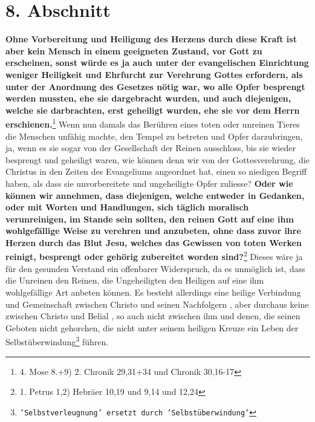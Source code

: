 \section{8. Abschnitt} \label{kap6_ab8}

\textbf{Ohne Vorbereitung und Heiligung des Herzens
durch diese Kraft ist aber kein
Mensch in einem geeigneten Zustand, vor Gott zu erscheinen, sonst würde es ja
auch unter der evangelischen Einrichtung weniger Heiligkeit und Ehrfurcht zur
Verehrung Gottes erfordern, als unter der Anordnung des Gesetzes nötig war, wo
alle Opfer besprengt werden mussten, ehe sie dargebracht wurden, und auch
diejenigen, welche sie darbrachten, erst geheiligt wurden, ehe sie vor dem
Herrn erschienen.}\footnote{4. Mose 8.+9) 2. Chronik 29,31+34 und Chronik
30,16-17}
Wenn nun damals das Berühren eines toten oder unreinen Tieres die Menschen
unfähig machte, den Tempel zu betreten und Opfer darzubringen, ja, wenn es sie
sogar von der Gesellschaft der Reinen ausschloss, bis sie wieder besprengt und
geheiligt waren, wie können denn wir von der Gottesverehrung, die Christus in
den Zeiten des Evangeliums angeordnet hat, einen so niedigen Begriff haben, als
dass sie unvorbereitete und ungeheiligte Opfer zuliesse?
\label{ref:06_08_moralisch_verunreinigt} \textbf{Oder wie können wir
annehmen, dass diejenigen, welche entweder in Gedanken, oder mit Worten und
Handlungen, sich täglich moralisch verunreinigen, im Stande sein sollten, den
reinen Gott auf eine ihm wohlgefällige Weise zu verehren und anzubeten, ohne
dass zuvor ihre Herzen durch das Blut Jesu, welches das Gewissen von toten
Werken  reinigt, besprengt oder gehörig zubereitet worden
sind?}\footnote{1. Petrus 1,2)  Hebräer 10,19 und 9,14 und 12,24}
Dieses wäre ja für den gesunden Verstand ein
offenbarer Widerspruch, da es unmöglich ist, dass die Unreinen den Reinen, die
Ungeheiligten den Heiligen   auf eine ihm
wohlgefällige Art anbeten können. Es
besteht allerdings eine heilige Verbindung und Gemeinschaft
zwischen Christo
und seinen Nachfolgern , aber durchaus keine
zwischen
Christo
und Belial , so
auch nicht zwischen ihm und denen, die seinen Geboten nicht gehorchen, die nicht
unter seinem heiligen Kreuze ein Leben der
Selbstüberwindung\footnote{\texttt{'Selbstverleugnung' ersetzt durch
'Selbstüberwindung'}} führen.

